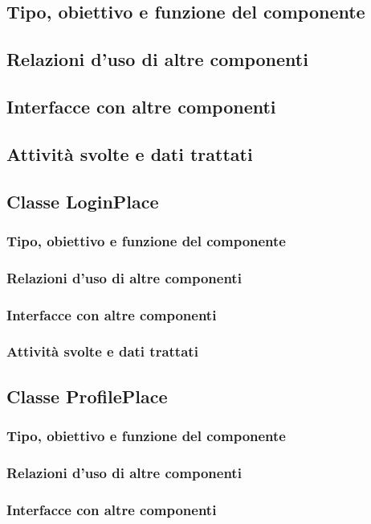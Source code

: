 \subsection*{Tipo, obiettivo e funzione del componente}
\subsection*{Relazioni d'uso di altre componenti}
\subsection*{Interfacce con altre componenti}
\subsection*{Attivit\`a svolte e dati trattati}

\subsection{Classe LoginPlace}
\subsubsection*{Tipo, obiettivo e funzione del componente}
\subsubsection*{Relazioni d'uso di altre componenti}
\subsubsection*{Interfacce con altre componenti}
\subsubsection*{Attivit\`a svolte e dati trattati}

\subsection{Classe ProfilePlace}
\subsubsection*{Tipo, obiettivo e funzione del componente}
\subsubsection*{Relazioni d'uso di altre componenti}
\subsubsection*{Interfacce con altre componenti}

